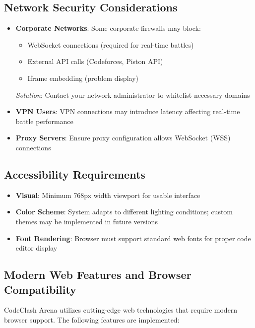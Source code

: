 \documentclass[12pt]{article}
\begin{document}
\subsection{Network Security Considerations}

\begin{itemize}
\item \textbf{Corporate Networks}: Some corporate firewalls may block:
  \begin{itemize}
    \item WebSocket connections (required for real-time battles)
    \item External API calls (Codeforces, Piston API)
    \item Iframe embedding (problem display)
  \end{itemize}

\begin{tcolorbox}
  \textit{Solution}: Contact your network administrator to whitelist necessary domains
\end{tcolorbox}
\item \textbf{VPN Users}: VPN connections may introduce latency affecting real-time battle performance
\item \textbf{Proxy Servers}: Ensure proxy configuration allows WebSocket (WSS) connections
\end{itemize}

\subsection{Accessibility Requirements}

\begin{itemize}
\item \textbf{Visual}: Minimum 768px width viewport for usable interface
\item \textbf{Color Scheme}: System adapts to different lighting conditions; custom themes may be implemented in future versions
\item \textbf{Font Rendering}: Browser must support standard web fonts for proper code editor display
\end{itemize}

\subsection{Modern Web Features and Browser Compatibility}

CodeClash Arena utilizes cutting-edge web technologies that require modern browser support. The following features are implemented:
\end{document}
